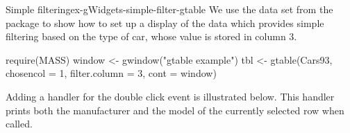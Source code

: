 \begin{example}{Simple filtering}{ex-gWidgets-simple-filter-gtable}
  We use the  data set from the  package to
  show how to set up a display of the data which provides simple
  filtering based on the type of car, whose value is stored in column 3.
  
\begin{Schunk}
\begin{Sinput}
 require(MASS)
 window <- gwindow("gtable example")
 tbl <- gtable(Cars93, chosencol = 1, filter.column = 3, 
               cont = window)
\end{Sinput}
\end{Schunk}

Adding a handler for the double click event is illustrated below. This
handler prints both the manufacturer and the model of the currently
selected row when called.
\begin{Schunk}
\end{Schunk}
\end{example}


